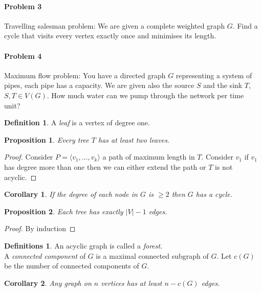 \documentclass{article}
\newtheorem*{cor}{Corollary}
\newtheorem*{prop}{Proposition}
\theoremstyle{definition}
\newtheorem*{defn}{Definition}
\newtheorem*{defns}{Definitions}
\begin{document}
\paragraph{Problem 3}
Travelling salesman problem:
We are given a complete weighted graph $G$.
Find a cycle that visits every vertex exactly once and minimises its length.

\paragraph{Problem 4}
Maximum flow problem:
You have a directed graph $G$ representing a system of pipes, each pipe has a capacity.
We are given also the source $S$ and the sink $T$, $S,T\in V(G)$.
How much water can we pump through the network per time unit?

\begin{defn}
A \emph{leaf} is a vertex of degree one.
\end{defn}

\begin{prop}
Every tree $T$ has at least two leaves.
\end{prop}

\begin{proof}
Consider $P=\langle v_1,\ldots,v_k\rangle$ a path of maximum length in $T$.
Consider $v_1$ if $v_1$ has degree more than one then we can either extend the path or $T$ is not acyclic.
\end{proof}


\begin{cor}
If the degree of each node in $G$ is $\ge 2$ then $G$ has a cycle.
\end{cor}

\begin{prop}
Each tree has exactly $|V| -1$ edges.
\end{prop}

\begin{proof}
\lbrack By induction\rbrack
\end{proof}

\begin{defns}
An acyclic graph is called a \emph{forest}.\\
A \emph{connected component} of $G$ is a maximal connected subgraph of $G$.
Let $c(G)$ be the number of connected components of $G$. %
\end{defns}

\begin{cor}
Any graph on $n$ vertices has at least $n-c(G)$ edges.
\end{cor}
\end{document}
